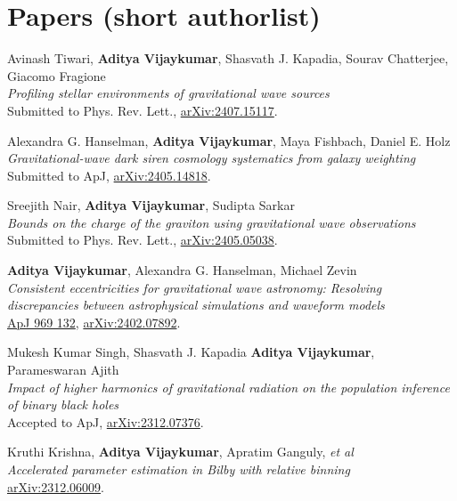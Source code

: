     \section{Papers (short authorlist)}
\begin{etaremune}

        \item Avinash Tiwari, \textbf{Aditya Vijaykumar}, Shasvath J. Kapadia, Sourav Chatterjee, Giacomo Fragione\\
        \textit{Profiling stellar environments of gravitational wave sources}\\
        Submitted to Phys. Rev. Lett., \href{https://arxiv.org/abs/2407.15117}{arXiv:2407.15117}.
        
	\item
	Alexandra G. Hanselman, \textbf{Aditya Vijaykumar}, Maya Fishbach, Daniel E. Holz  \\
	\textit{Gravitational-wave dark siren cosmology systematics from galaxy weighting}\\
	Submitted to ApJ, \href{https://arxiv.org/abs/2405.14818}{arXiv:2405.14818}.

	\item
	Sreejith Nair, \textbf{Aditya Vijaykumar}, Sudipta Sarkar  \\
	\textit{Bounds on the charge of the graviton using gravitational wave observations}\\
	Submitted to Phys. Rev. Lett., \href{https://arxiv.org/abs/2405.05038}{arXiv:2405.05038}.
	
	\item
	 \textbf{Aditya Vijaykumar}, Alexandra G. Hanselman, Michael Zevin  \\
	\textit{Consistent eccentricities for gravitational wave astronomy: Resolving discrepancies between astrophysical simulations and waveform models}\\
	\href{https://iopscience.iop.org/article/10.3847/1538-4357/ad4455}{ApJ 969 132}, \href{https://arxiv.org/abs/2402.07892}{arXiv:2402.07892}.

	\item
	Mukesh Kumar Singh, Shasvath J. Kapadia \textbf{Aditya Vijaykumar}, Parameswaran Ajith  \\
	\textit{Impact of higher harmonics of gravitational radiation on the population inference of binary black holes}\\
	Accepted to ApJ, \href{https://arxiv.org/abs/2312.07376}{arXiv:2312.07376}.

	\item
	Kruthi Krishna, \textbf{Aditya Vijaykumar}, Apratim Ganguly, \textit{et al}  \\
	\textit{Accelerated parameter estimation in Bilby with relative binning}\\
	\href{https://arxiv.org/abs/2312.06009}{arXiv:2312.06009}.


\end{etaremune}
